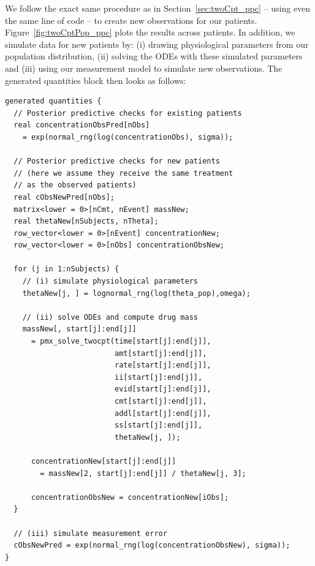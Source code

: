 We follow the exact same procedure as in Section~\ref{sec:twoCpt_ppc} -- using even the same line of code -- to create new observations for our patients.
Figure~\ref{fig:twoCptPop_ppc} plots the results across patients.
In addition, we simulate data for new patients by: (i) drawing physiological parameters from our population distribution, (ii) solving the ODEs with these simulated parameters and (iii) using our measurement model to simulate new observations.
The generated quantities block then looks as follows:
%
\begin{lstlisting}[style=stan, numbers=none]
generated quantities {
  // Posterior predictive checks for existing patients
  real concentrationObsPred[nObs] 
    = exp(normal_rng(log(concentrationObs), sigma));

  // Posterior predictive checks for new patients
  // (here we assume they receive the same treatment 
  // as the observed patients)
  real cObsNewPred[nObs];
  matrix<lower = 0>[nCmt, nEvent] massNew;
  real thetaNew[nSubjects, nTheta];
  row_vector<lower = 0>[nEvent] concentrationNew;
  row_vector<lower = 0>[nObs] concentrationObsNew;

  for (j in 1:nSubjects) {
    // (i) simulate physiological parameters
    thetaNew[j, ] = lognormal_rng(log(theta_pop),omega);

    // (ii) solve ODEs and compute drug mass
    massNew[, start[j]:end[j]]
      = pmx_solve_twocpt(time[start[j]:end[j]],
                         amt[start[j]:end[j]],
                         rate[start[j]:end[j]],
                         ii[start[j]:end[j]],
                         evid[start[j]:end[j]],
                         cmt[start[j]:end[j]],
                         addl[start[j]:end[j]],
                         ss[start[j]:end[j]],
                         thetaNew[j, ]);

      concentrationNew[start[j]:end[j]]
        = massNew[2, start[j]:end[j]] / thetaNew[j, 3];

      concentrationObsNew = concentrationNew[iObs];
  }

  // (iii) simulate measurement error 
  cObsNewPred = exp(normal_rng(log(concentrationObsNew), sigma));
}
\end{lstlisting}

